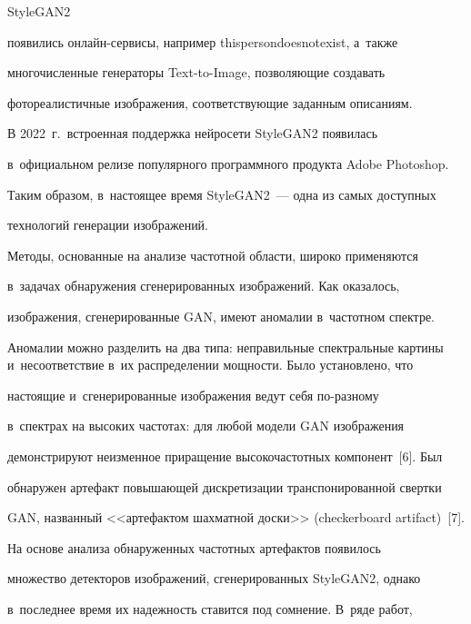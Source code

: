 \noindent


 \mbox{StyleGAN2} 


появились он\-лайн-сер\-ви\-сы, например \mbox{thispersondoesnotexist}, а~также 


многочисленные генераторы Text-to-Image, позволяющие создавать 


фотореалистичные изображения, соответствующие заданным описаниям.


  


  В 2022~г.\ встроенная поддержка нейросети StyleGAN2 появилась 


в~официальном релизе популярного программного продукта Adobe Photoshop.


  


  Таким образом, в~настоящее время StyleGAN2~--- одна из самых доступных 


технологий генерации изображений.


  


  Методы, основанные на анализе частотной области, широко применяются 


в~задачах обнаружения сгенерированных изображений. Как оказалось, 


изображения, сгенерированные GAN, имеют аномалии в~частотном спектре. 


Аномалии можно разделить на два типа: неправильные спектральные картины и~несоответствие в~их распределении мощности. Было установлено, что 


настоящие и~сгенерированные изображения ведут себя по-раз\-но\-му 


в~спектрах на высоких частотах: для любой модели GAN изображения 


демонстрируют неизменное приращение высокочастотных компонент~[6]. Был 


обнаружен артефакт повышающей дискретизации транспонированной свертки 


GAN, названный <<артефактом шахматной доски>> (checkerboard artifact)~[7]. 


  


  На основе анализа обнаруженных частотных артефактов появилось 


множество детекторов изображений, сгенерированных StyleGAN2, однако 


в~последнее время их надежность ставится под сомнение. В~ряде работ, 


